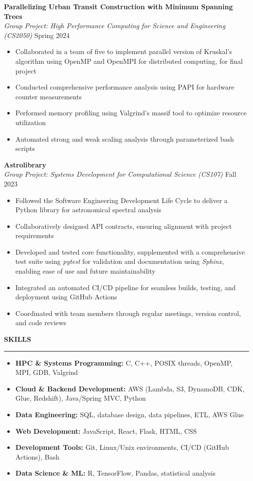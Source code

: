 \documentclass[11pt,a4paper]{article}
\newcommand{\sectionheading}[1]{\vspace{0.2cm}\textbf{\Large #1}\vspace{0.1cm}\hrule\vspace{0.3cm}}
\newcommand{\subheading}[1]{\textbf{#1}}
\newcommand{\daterange}[1]{\hfill{#1}}
\begin{document}
\medbreak
\subheading{Parallelizing Urban Transit Construction with Minimum Spanning Trees}\\
\textit{Group Project: High Performance Computing for Science and Engineering (CS2050)} \daterange{Spring 2024}
\begin{itemize}[leftmargin=*,nosep]
    \item Collaborated in a team of five to implement parallel version of Kruskal's algorithm using OpenMP and OpenMPI for distributed computing, for final project
    \item Conducted comprehensive performance analysis using PAPI for hardware counter measurements
    \item Performed memory profiling using Valgrind's massif tool to optimize resource utilization
    \item Automated strong and weak scaling analysis through parameterized bash scripts
\end{itemize}
\medbreak
\subheading{Astrolibrary} \\
\textit{Group Project: Systems Development for Computational Science (CS107)} \daterange{Fall 2023}
\begin{itemize}[leftmargin=*,nosep]
    \item Followed the Software Engineering Development Life Cycle to deliver a Python library for astronomical spectral analysis
    \item Collaboratively designed API contracts, ensuring alignment with project requirements
    \item Developed and tested core functionality, supplemented with a comprehensive test suite using \textit{pytest} for validation and documentation using \textit{Sphinx}, enabling ease of use and future maintainability
    \item Integrated an automated CI/CD pipeline for seamless builds, testing, and deployment using GitHub Actions
    \item Coordinated with team members through regular meetings, version control, and code reviews
\end{itemize}


\sectionheading{SKILLS}
\begin{itemize}[leftmargin=*,nosep]
    \item \textbf{HPC \& Systems Programming:} C, C++, POSIX threads, OpenMP, MPI, GDB, Valgrind
    \item \textbf{Cloud \& Backend Development:} AWS (Lambda, S3, DynamoDB, CDK, Glue, Redshift), Java/Spring MVC, Python
    \item \textbf{Data Engineering:} SQL, database design, data pipelines, ETL, AWS Glue
    \item \textbf{Web Development:} JavaScript, React, Flask, HTML, CSS
    \item \textbf{Development Tools:} Git, Linux/Unix environments, CI/CD (GitHub Actions), Bash
    \item \textbf{Data Science \& ML:} R, TensorFlow, Pandas, statistical analysis
\end{itemize}
\end{document}
